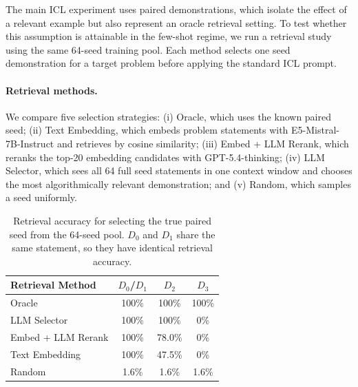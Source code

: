 \documentclass[]{bytedance_seed}
\theoremstyle{plain}
\theoremstyle{definition}
\theoremstyle{remark}
\begin{document}
The main ICL experiment uses paired demonstrations, which isolate the effect of a relevant example but also represent an oracle retrieval setting. To test whether this assumption is attainable in the few-shot regime, we run a retrieval study using the same 64-seed training pool. Each method selects one seed demonstration for a target problem before applying the standard ICL prompt.

\paragraph{Retrieval methods.}
We compare five selection strategies: (i) Oracle, which uses the known paired seed; (ii) Text Embedding, which embeds problem statements with E5-Mistral-7B-Instruct and retrieves by cosine similarity; (iii) Embed + LLM Rerank, which reranks the top-20 embedding candidates with GPT-5.4-thinking; (iv) LLM Selector, which sees all 64 full seed statements in one context window and chooses the most algorithmically relevant demonstration; and (v) Random, which samples a seed uniformly.

\begin{table}[h]
\centering
\small
\caption{Retrieval accuracy for selecting the true paired seed from the 64-seed pool. $D_0$ and $D_1$ share the same statement, so they have identical retrieval accuracy.}
\label{tab:icl-retrieval-accuracy}
\begin{tabular}{lccc}
\toprule
\textbf{Retrieval Method} & \textbf{$D_0$/$D_1$} & \textbf{$D_2$} & \textbf{$D_3$} \\
\midrule
Oracle & 100\% & 100\% & 100\% \\
LLM Selector & 100\% & 100\% & 0\% \\
Embed + LLM Rerank & 100\% & 78.0\% & 0\% \\
Text Embedding & 100\% & 47.5\% & 0\% \\
Random & 1.6\% & 1.6\% & 1.6\% \\
\bottomrule
\end{tabular}
\end{table}
\end{document}
